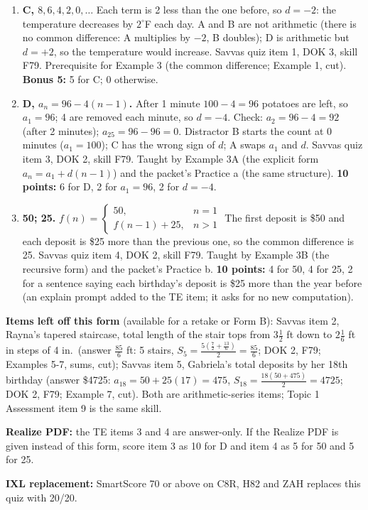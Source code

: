 \documentclass[11pt]{article}
\begin{document}
\begin{enumerate}
\item[\textbf{1.}] \textbf{C, $8, 6, 4, 2, 0, \ldots$} Each term is 2 less than the one before, so $d=-2$: the temperature decreases by $2^{\circ}$F each day. A and B are not arithmetic (there is no common difference: A multiplies by $-2$, B doubles); D is arithmetic but $d=+2$, so the temperature would increase. Savvas quiz item 1, DOK 3, skill F79. Prerequisite for Example 3 (the common difference; Example 1, cut). \textbf{Bonus 5:} 5 for C; 0 otherwise.
\item[\textbf{3.}] \textbf{D, $a_n=96-4(n-1)$.} After 1 minute $100-4=96$ potatoes are left, so $a_1=96$; 4 are removed each minute, so $d=-4$. Check: $a_2=96-4=92$ (after 2 minutes); $a_{25}=96-96=0$. Distractor B starts the count at 0 minutes ($a_1=100$); C has the wrong sign of $d$; A swaps $a_1$ and $d$. Savvas quiz item 3, DOK 2, skill F79. Taught by Example 3A (the explicit form $a_n=a_1+d(n-1)$) and the packet's Practice a (the same structure). \textbf{10 points:} 6 for D, 2 for $a_1=96$, 2 for $d=-4$.
\item[\textbf{4.}] \textbf{50; 25.} $f(n)=\begin{cases}50, & n=1\\ f(n-1)+25, & n>1\end{cases}$ The first deposit is \$50 and each deposit is \$25 more than the previous one, so the common difference is 25. Savvas quiz item 4, DOK 2, skill F79. Taught by Example 3B (the recursive form) and the packet's Practice b. \textbf{10 points:} 4 for 50, 4 for 25, 2 for a sentence saying each birthday's deposit is \$25 more than the year before (an explain prompt added to the TE item; it asks for no new computation).
\end{enumerate}

\textbf{Items left off this form} (available for a retake or Form B): Savvas item 2, Rayna's tapered staircase, total length of the stair tops from $3\tfrac12$ ft down to $2\tfrac16$ ft in steps of 4 in.\ (answer $\tfrac{85}{6}$ ft: 5 stairs, $S_5=\tfrac{5(\frac72+\frac{13}{6})}{2}=\tfrac{85}{6}$; DOK 2, F79; Examples 5-7, sums, cut); Savvas item 5, Gabriela's total deposits by her 18th birthday (answer \$4725: $a_{18}=50+25(17)=475$, $S_{18}=\tfrac{18(50+475)}{2}=4725$; DOK 2, F79; Example 7, cut). Both are arithmetic-series items; Topic 1 Assessment item 9 is the same skill.

\textbf{Realize PDF:} the TE items 3 and 4 are answer-only. If the Realize PDF is given instead of this form, score item 3 as 10 for D and item 4 as 5 for 50 and 5 for 25.

\textbf{IXL replacement:} SmartScore 70 or above on C8R, H82 and ZAH replaces this quiz with 20/20.
\end{document}
